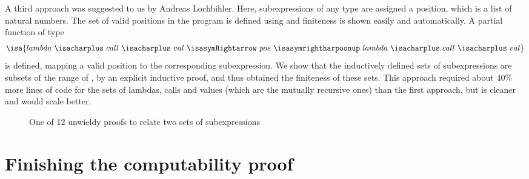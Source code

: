 \documentclass[a4paper,parskip=half,BCOR=8mm,DIV=calc,12pt]{scrbook}
\begin{document}
% 
A third approach was suggested to us by Andreas Lochbihler. Here, subexpressions of any type are assigned a position, which is a list of natural numbers. The set  of valid positions in the program  is defined using  and finiteness is shown easily and automatically. A partial function  of type
\[
\isa{lambda\ {\isacharplus}\ call\ {\isacharplus}\ val\ {\isasymRightarrow}\ pos\ {\isasymrightharpoonup}\ lambda\ {\isacharplus}\ call\ {\isacharplus}\ val}
\]
is defined, mapping a valid position to the corresponding subexpression. We show that the inductively defined sets of subexpressions are subsets of the range of , by an explicit inductive proof, and thus obtained the finiteness of these sets. This approach required about 40\% more lines of code for the sets of lambdas, calls and values (which are the mutually recursive ones) than the first approach, but is cleaner and would scale better.

 

\begin{figure}
\begin{framed}

\end{framed}
\caption{One of 12 unwieldy proofs to relate two sets of subexpressions}
\label{fig:subexprlemma}
\end{figure}

\section{Finishing the computability proof}
\end{document}
